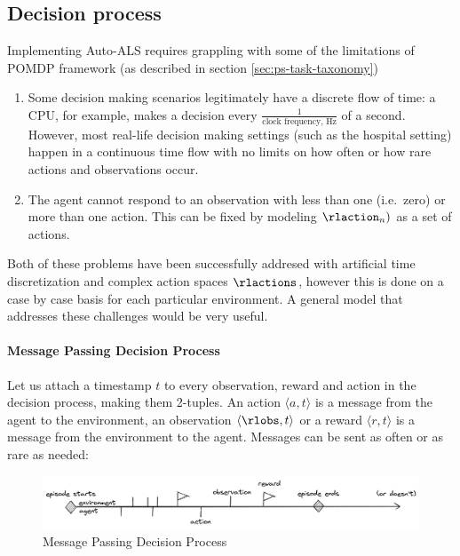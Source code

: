\newpage
\subsection{Decision process}
\label{sec:mpdp}

Implementing Auto-ALS requires grappling with some of the limitations of POMDP framework (as described in section \ref{sec:ps-task-taxonomy})
\begin{enumerate}
    \item Some decision making scenarios legitimately have a discrete flow of time: a CPU, for example, makes a decision every $\frac{1}{\text{clock frequency, Hz}}$ of a second. However, most real-life decision making settings (such as the hospital setting) happen in a continuous time flow with no limits on how often or how rare actions and observations occur.
    \item The agent cannot respond to an observation with less than one (i.e.~zero) or more than one action. This can be fixed by modeling $\rlaction_n)$ as a set of actions.
\end{enumerate}

Both of these problems have been successfully addresed with artificial time discretization and complex action spaces $\rlactions$, however this is done on a case by case basis for each particular environment. A general model that addresses these challenges would be very useful.

\paragraph{Message Passing Decision Process}

Let us attach a timestamp $t$ to every observation, reward and action in the decision process, making them 2-tuples. An action $\langle a, t\rangle$ is a message from the agent to the environment, an observation $\langle \rlobs, t \rangle$ or a reward $\langle r, t \rangle$ is a message from the environment
to the agent. Messages can be sent as often or as rare as needed:

\begin{figure}
\centering
\includegraphics[width=\linewidth]{images/mpdp.png}
\caption{Message Passing Decision Process}
\end{figure}

